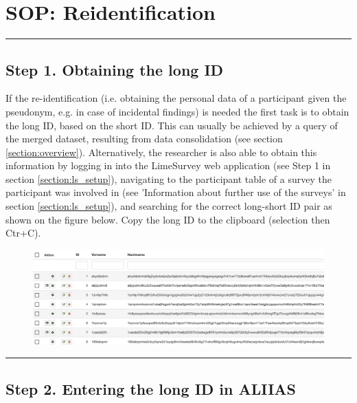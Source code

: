 \pagebreak
\section{SOP: Reidentification}
\label{section:sop_reidentification}

\par\noindent\rule{\textwidth\color{pniblue}}{0.4pt}
\subsection*{Step 1. Obtaining the long ID}

If the re-identification (i.e. obtaining the personal data of a participant given the pseudonym, e.g. in case of incidental findings) is needed the first task is to obtain the long ID, based on the short ID.
This can usually be achieved by a query of the merged dataset, resulting from data consolidation (see section \ref{section:overview}). Alternatively, the researcher is also able to obtain this information by logging in into the LimeSurvey web application (see Step 1 in section \ref{section:ls_setup}), navigating to the participant table of a survey the participant was involved in (see 'Information about further use of the surveys' in section \ref{section:ls_setup}), and searching for the correct long-short ID pair as shown on the figure below.
Copy the long ID to the clipboard (selection then Ctr+C).

\begin{figure}[H]
\includegraphics[width=1.0\textwidth]{docs/fig/ls_pseudonyms.png}
\end{figure}


\par\noindent\rule{\textwidth\color{pniblue}}{0.4pt}
\subsection*{Step 2. Entering the long ID in ALIIAS}

